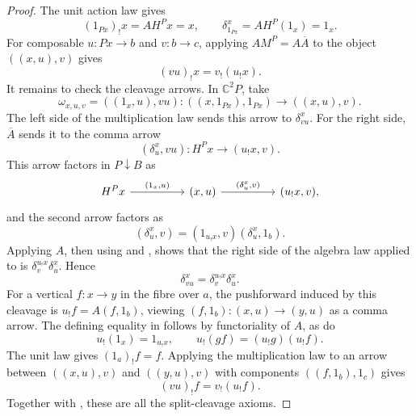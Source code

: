 \documentclass[11pt]{article}
\theoremstyle{plain}
\theoremstyle{definition}
\theoremstyle{remark}
\newcommand{\C}{\mathbb{C}}
\numberwithin{equation}{section}
\begin{document}
\begin{proof}
The unit action law gives
\begin{equation}
(1_{Px})_{!}x=AH^{P}x=x,
  \qquad
  \delta^{x}_{1_{Px}}=AH^{P}(1_x)=1_x.
  \label{eq:action-unit-split}
\end{equation}
For composable $u\colon Px\to b$ and $v\colon b\to c$, applying
$AM^{P}=A\overline A$ to the object $((x,u),v)$ gives
\begin{equation}
(vu)_{!}x=v_{!}(u_{!}x).
  \label{eq:action-object-split}
\end{equation}
It remains to check the cleavage arrows.  In $\C^2P$, take
\begin{equation}
\omega_{x,u,v}=((1_x,u),vu)
  \colon((x,1_{Px}),1_{Px})\longrightarrow((x,u),v).
  \label{eq:multiplication-test-arrow}
\end{equation}
The left side of the multiplication law sends this arrow to
$\delta^{x}_{vu}$.  For the right side, $\overline A$ sends it to
the comma arrow
\begin{equation*}
(\delta^{x}_{u},vu)
  \colon H^{P}x\longrightarrow(u_{!}x,v).
\end{equation*}
This arrow factors in $P\!\downarrow\!B$ as
\begin{equation*}
\begin{tikzcd}[column sep=huge]
H^{P}x
  \arrow[r,"{(1_x,u)}"]
& (x,u)
  \arrow[r,"{(\delta^{x}_{u},v)}"]
& (u_{!}x,v),
\end{tikzcd}
\end{equation*}
and the second arrow factors as
\begin{equation*}
(\delta^{x}_{u},v)
  =(1_{u_{!}x},v)(\delta^{x}_{u},1_b).
\end{equation*}
Applying $A$, then using  and
, shows that the right side of the algebra law
applied to  is
$\delta^{u_{!}x}_{v}\delta^{x}_{u}$.  Hence
\begin{equation}
\delta^{x}_{vu}=\delta^{u_{!}x}_{v}\delta^{x}_{u}.
  \label{eq:action-delta-split}
\end{equation}
For a vertical $f\colon x\to y$ in the fibre over $a$, the pushforward
induced by this cleavage is
$u_{!}f=A(f,1_b)$, viewing $(f,1_b)\colon(x,u)\to(y,u)$ as a comma
arrow.  The defining equality in  follows by
functoriality of $A$, as do
\begin{equation*}
  u_{!}(1_x)=1_{u_{!}x},
  \qquad
  u_{!}(gf)=(u_{!}g)(u_{!}f).
\end{equation*}
The unit law gives $(1_a)_{!}f=f$.  Applying the multiplication law
to an arrow between $((x,u),v)$ and $((y,u),v)$ with components
$((f,1_b),1_c)$ gives
\begin{equation*}
(vu)_{!}f=v_{!}(u_{!}f).
\end{equation*}
Together with
,
these are all the split-cleavage axioms.
\end{proof}
\end{document}
